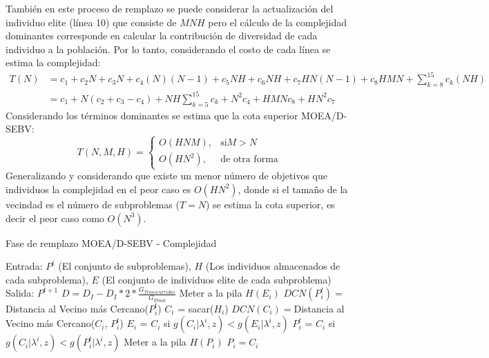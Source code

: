 También en este proceso de remplazo se puede considerar la actualización del individuo elite (línea 10) que consiste de $MNH$ pero el cálculo de la complejidad dominantes corresponde en calcular la contribución de diversidad de cada individuo a la población.
%
Por lo tanto, considerando el costo de cada línea se estima la complejidad:
\begin{equation}
\begin{split}
T(N) &= c_1 + c_2N + c_3N + c_4(N)(N-1) + c_5NH + c_6NH + c_7HN(N-1) +c_8HMN + \sum_{k=8}^{15} c_k(NH) \\
    &=  c_1 + N(c_2 + c_3 - c_4) + N H \sum_{k=5}^{15} c_k + N^2c_4+ HMNc_8 + H N^2 c_7
\end{split}
\end{equation}
%
Considerando los términos dominantes se estima que la cota superior MOEA/D-SEBV:
\[
    T(N,M,H)= 
\begin{cases}
     O(HNM),& \text{si} M > N\\
     O(HN^2),& \text{de otra forma}
\end{cases}
\]
Generalizando y considerando que existe un menor número de objetivos que individuos la complejidad en el peor caso es $O(HN^2)$, donde si el tamaño de la vecindad es el número de subproblemas ($T=N$) se estima la cota superior, es decir el peor caso como $O(N^3)$.

\begin{algorithm}[H]
  \scriptsize
	\caption{Fase de remplazo MOEA/D-SEBV - Complejidad} 
        \label{alg:complejidad_MOEAD_SEBV}
	\begin{algorithmic}[1]
    	\STATE Entrada: $P^t$ (El conjunto de subproblemas), $H$ (Los individuos almacenados de cada subproblema), $E$ (El conjunto de individuos elite de cada subproblema)
    	\STATE Salida: $P^{t+1}$
		\STATE $D = D_I - D_I *2* \frac{G_{Transcurridas}}{G_{Final}}$
	 
	     \STATE Meter a la pila $H(E_i)$
	     \STATE $DCN(P_i^t) =  $ Distancia al Vecino más Cercano($P_i^t$) 
	    
	      \STATE $C_i$ = sacar($H_i$) 
	      \STATE $DCN(C_i) = $Distancia al Vecino más Cercano($C_i$, $P_i^t$) 
	      \STATE $E_i$ = $C_i$ si $g(C_i| \lambda^i, z) < g(E_i| \lambda^i, z)$  
	        
	         \STATE $P_i^t$ = $C_i$ si $g(C_i| \lambda^i, z) < g(P_i^t| \lambda^i, z)$ 
	        
		 
		 \STATE Meter a la pila $H( P_i  )$ 
		 \STATE $P_i = C_i$ 
		\ENDIF 
	      \ENDIF
	   \ENDWHILE 
	\ENDFOR 
\end{algorithmic}
\end{algorithm}


